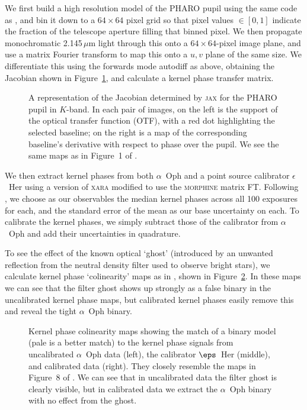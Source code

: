\documentclass[modern]{aastex63}
\begin{document}
We first build a high resolution model of the PHARO pupil using the same code as \citet{martinache20}, and bin it down to a $64\times64$ pixel grid so that pixel values $\in [0,1]$ indicate the fraction of the telescope aperture filling that binned pixel. We then propagate monochromatic 2.145\,$\mu$m light through this onto a $64\times64$-pixel image plane, and use a matrix Fourier transform to map this onto a $u,v$ plane of the same size. We differentiate this using the forwards mode autodiff as above, obtaining the Jacobian shown in Figure~\ref{pharo_jacobian}, and calculate a kernel phase transfer matrix.

\begin{figure}
\caption{A representation of the Jacobian determined by \textsc{jax} for the PHARO pupil in $K$-band. In each pair of images, on the left is the support of the optical transfer function (OTF), with a red dot highlighting the selected baseline; on the right is a map of the corresponding baseline's derivative with respect to phase over the pupil. We see the same maps as in Figure~1 of \citet{martinache10}. \label{pharo_jacobian}}
\end{figure}

We then extract kernel phases from both $\alpha$~Oph and a point source calibrator $\epsilon$~Her using a version of \textsc{xara} modified to use the \textsc{morphine} matrix FT. Following \citet{martinache20}, we choose as our observables the median kernel phases across all 100 exposures for each, and the standard error of the mean as our base uncertainty on each. To calibrate the kernel phases, we simply subtract those of the calibrator from $\alpha$~Oph and add their uncertainties in quadrature. 

To see the effect of the known optical `ghost' (introduced by an unwanted reflection from the neutral density filter used to observe bright stars), we calculate kernel phase `colinearity' maps as in \citet{martinache20}, shown in Figure~\ref{colinearity}. In these maps we can see that the filter ghost shows up strongly as a false binary in the uncalibrated kernel phase maps, but calibrated kernel phases easily remove this and reveal the tight $\alpha$~Oph binary.


\begin{figure}
\caption{Kernel phase colinearity maps showing the match of a binary model (pale is a better match) to the kernel phase signals from uncalibrated $\alpha$~Oph data (left), the calibrator $\eps$~Her (middle), and calibrated data (right). They closely resemble the maps in Figure~8 of \citet{martinache20}. We can see that in uncalibrated data the filter ghost is clearly visible, but in calibrated data we extract the $\alpha$~Oph binary with no effect from the ghost. \label{colinearity}}
\end{figure}
\end{document}
